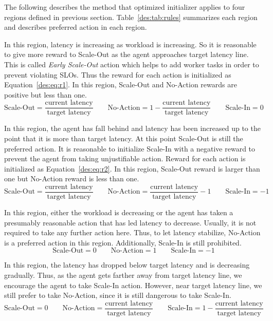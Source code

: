The following describes the method that optimized initializer applies to four regions defined in previous section. Table~\ref{des:tab:rules} summarizes each region and describes preferred action in each region.
\begin{description}[leftmargin=0pt]
    \item[Region 1] In this region, latency is increasing as workload is increasing. So it is reasonable to give more reward to Scale-Out as the agent approaches target latency line. This is called \emph{Early Scale-Out} action which helps to add worker tasks in order to prevent violating SLOs. Thus the reward for each action is initialized as Equation~\ref{des:eq:r1}. In this region, Scale-Out and No-Action rewards are positive but less than one.
    \begin{equation}
    \text{Scale-Out}=\frac{\text{current latency}}{\text{target latency}} \qquad \text{No-Action}=1-\frac{\text{current latency}}{\text{target latency}} \qquad \text{Scale-In}=0
    \label{des:eq:r1}
    \end{equation}
    \clearpage
    \item[Region 2] In this region, the agent has fall behind and latency has been increased up to the point that it is more than target latency. At this point Scale-Out is still the preferred action. It is reasonable to initialize Scale-In with a negative reward to prevent the agent from taking unjustifiable action.
    Reward for each action is initialized as Equation~\ref{des:eq:r2}. In this region, Scale-Out reward is larger than one but No-Action reward is less than one.
    \begin{equation}
    \text{Scale-Out}=\frac{\text{current latency}}{\text{target latency}} \qquad \text{No-Action}=\frac{\text{current latency}}{\text{target latency}}-1 \qquad \text{Scale-In}=-1
    \label{des:eq:r2}
    \end{equation}
    \item[Region 3] In this region, either the workload is decreasing or the agent has taken a presumably reasonable action that has led latency to decrease. Usually, it is not required to take any further action here. Thus, to let latency stabilize, No-Action is a preferred action in this region. Additionally, Scale-In is still prohibited.
    \begin{equation}
    \text{Scale-Out}=0 \qquad \text{No-Action}=1 \qquad \text{Scale-In}=-1
    \label{des:eq:r3}
    \end{equation}
    \item[Region 4] In this region, the latency has dropped below target latency and is decreasing gradually. Thus, as the agent gets farther away from target latency line, we encourage the agent to take Scale-In action. However, near target latency line, we still prefer to take No-Action, since it is still dangerous to take Scale-In.
    \begin{equation}
    \text{Scale-Out}=0 \qquad \text{No-Action}=\frac{\text{current latency}}{\text{target latency}} \qquad \text{Scale-In}=1-\frac{\text{current latency}}{\text{target latency}}
    \label{des:eq:r4}
    \end{equation}
\end{description}
